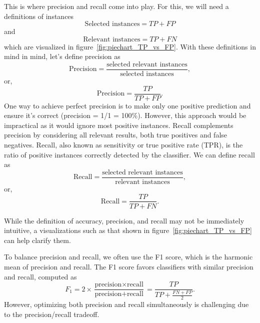 \documentclass[12pt,letter]{article}
\begin{document}
This is where precision and recall come into play. For this, we will need a definitions of instances
\begin{equation}
\text{Selected instances} = TP + FP
\end{equation}
and
\begin{equation}
\text{Relevant instances} = TP + FN
\end{equation}
which are visualized in figure~\ref{fig:piechart_TP_vs_FP}. With these definitions in mind in mind, let's define precision as
\begin{equation}
\text{Precision} = \frac{\text{selected relevant instances}}{\text{selected instances}},
\end{equation}
or,
\begin{equation}
\text{Precision} = \frac{TP}{TP + FP}.
\end{equation}
One way to achieve perfect precision is to make only one positive prediction and ensure it's correct (precision = 1/1 = 100\%). However, this approach would be impractical as it would ignore most positive instances. Recall complements precision by considering all relevant results, both true positives and false negatives. Recall, also known as sensitivity or true positive rate (TPR), is the ratio of positive instances correctly detected by the classifier. We can define recall as
\begin{equation}
\text{Recall} = \frac{\text{selected relevant instances}}{\text{relevant instances}},
\end{equation}
or,
\begin{equation}
\text{Recall} = \frac{TP}{TP + FN}.
\end{equation}

While the definition of accuracy, precision, and recall may not be immediately intuitive, a visualizations such as that shown in figure~\ref{fig:piechart_TP_vs_FP} can help clarify them.

\pagebreak

To balance precision and recall, we often use the F1 score, which is the harmonic mean of precision and recall. The F1 score favors classifiers with similar precision and recall, computed as
\begin{equation}
F_1 = 2 \times \frac { \text{precision} \times \text{recall}}{\text{precision} + \text{recall}} = \frac{TP}{TP + \frac{FN + FP}{2}}.
\end{equation}
However, optimizing both precision and recall simultaneously is challenging due to the precision/recall tradeoff. 
\end{document}
